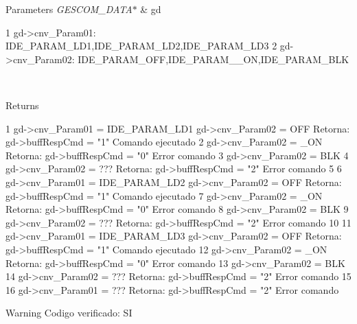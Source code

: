 \begin{DoxyParams}{Parameters}
{\em G\+E\+S\+C\+O\+M\+\_\+\+D\+A\+T\+A$\ast$} & gd 
\begin{DoxyCode}
1 gd->cnv\_Param01: IDE\_PARAM\_LD1,IDE\_PARAM\_LD2,IDE\_PARAM\_LD3
2 gd->cnv\_Param02: IDE\_PARAM\_OFF,IDE\_PARAM\_\_ON,IDE\_PARAM\_BLK
\end{DoxyCode}
\\
\hline
\end{DoxyParams}
\begin{DoxyReturn}{Returns}

\begin{DoxyCode}
1 gd->cnv\_Param01 = IDE\_PARAM\_LD1 gd->cnv\_Param02 = OFF Retorna: gd->buffRespCmd = "1"  Comando ejecutado
2                                 gd->cnv\_Param02 = \_ON Retorna: gd->buffRespCmd = "0"  Error comando
3                                 gd->cnv\_Param02 = BLK  
4                                 gd->cnv\_Param02 = ??? Retorna: gd->buffRespCmd = "2"  Error comando
5                                 
6 gd->cnv\_Param01 = IDE\_PARAM\_LD2 gd->cnv\_Param02 = OFF Retorna: gd->buffRespCmd = "1"  Comando ejecutado
7                                 gd->cnv\_Param02 = \_ON Retorna: gd->buffRespCmd = "0"  Error comando
8                                 gd->cnv\_Param02 = BLK  
9                                 gd->cnv\_Param02 = ??? Retorna: gd->buffRespCmd = "2"  Error comando
10                                                                  
11 gd->cnv\_Param01 = IDE\_PARAM\_LD3 gd->cnv\_Param02 = OFF Retorna: gd->buffRespCmd = "1"  Comando ejecutado
12                                 gd->cnv\_Param02 = \_ON Retorna: gd->buffRespCmd = "0"  Error comando
13                                 gd->cnv\_Param02 = BLK  
14                                 gd->cnv\_Param02 = ??? Retorna: gd->buffRespCmd = "2"  Error comando
15                                 
16 gd->cnv\_Param01 = ???                                 Retorna: gd->buffRespCmd = "2"  Error comando
\end{DoxyCode}

\end{DoxyReturn}
\begin{DoxyWarning}{Warning}
Codigo verificado\+: SI 

 
\end{DoxyWarning}
